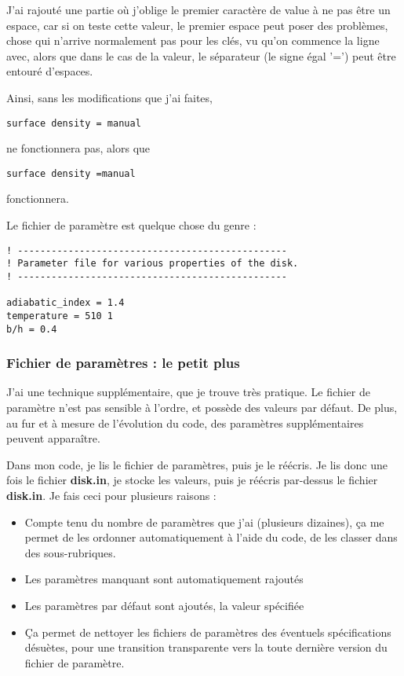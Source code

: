 \begin{attention}
J'ai rajouté une partie où j'oblige le premier caractère de value à ne pas être un espace, car si on teste cette valeur, le premier espace peut poser des problèmes, chose qui n'arrive normalement pas pour les clés, vu qu'on commence la ligne avec, alors que dans le cas de la valeur, le séparateur (le signe égal '=') peut être entouré d'espaces.

Ainsi, sans les modifications que j'ai faites, 
\begin{verbatim}
surface density = manual
\end{verbatim}
ne fonctionnera pas, alors que
\begin{verbatim}
surface density =manual
\end{verbatim}
fonctionnera.
\end{attention}


Le fichier de paramètre est quelque chose du genre :
\begin{verbatim}
! ------------------------------------------------
! Parameter file for various properties of the disk. 
! ------------------------------------------------

adiabatic_index = 1.4
temperature = 510 1
b/h = 0.4
\end{verbatim}

\subsubsection{Fichier de paramètres : le petit plus}
J'ai une technique supplémentaire, que je trouve très pratique. Le fichier de paramètre n'est pas sensible à l'ordre, et possède des valeurs par défaut. De plus, au fur et à mesure de l'évolution du code, des paramètres supplémentaires peuvent apparaître. 

Dans mon code, je lis le fichier de paramètres, puis je le réécris. Je lis donc une fois le fichier \textbf{disk.in}, je stocke les valeurs, puis je réécris par-dessus le fichier \textbf{disk.in}. Je fais ceci pour plusieurs raisons : 
\begin{itemize}
\item Compte tenu du nombre de paramètres que j'ai (plusieurs dizaines), ça me permet de les ordonner automatiquement à l'aide du code, de les classer dans des sous-rubriques. 
\item Les paramètres manquant sont automatiquement rajoutés
\item Les paramètres par défaut sont ajoutés, la valeur spécifiée
\item Ça permet de nettoyer les fichiers de paramètres des éventuels spécifications désuètes, pour une transition transparente vers la toute dernière version du fichier de paramètre.
\end{itemize}

